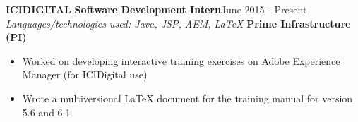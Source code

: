 \documentclass[11pt, letterpaper]{article}
\begin{document}
\begin{multicols}{2}
			{\bfseries ICIDIGITAL}\newline
			{\bfseries \small Software Development Intern}\hfill{June 2015 - Present}\newline			
				\textit{Languages/technologies used: Java, JSP, AEM, LaTeX}\newline
				{\bfseries Prime Infrastructure (PI)}
				\begin{itemize}[nolistsep,leftmargin=*]
					\item Worked on developing interactive training exercises on Adobe Experience Manager (for ICIDigital use)
					\item Wrote a multiversional LaTeX document for the training manual for version 5.6 and 6.1
				\end{itemize}





\end{multicols}
\end{document}
